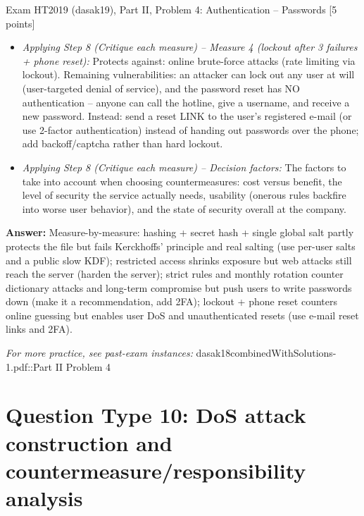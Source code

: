 \documentclass[12pt, a4paper]{article}
\begin{document}
\begin{practicebox}{Exam HT2019 (dasak19), Part II, Problem 4: Authentication -- Passwords [5 points]}
\begin{itemize}
    \item \textit{Applying Step 8 (Critique each measure) -- Measure 4 (lockout after 3 failures + phone reset):} Protects against: online brute-force attacks (rate limiting via lockout). Remaining vulnerabilities: an attacker can lock out any user at will (user-targeted denial of service), and the password reset has NO authentication -- anyone can call the hotline, give a username, and receive a new password. Instead: send a reset LINK to the user's registered e-mail (or use 2-factor authentication) instead of handing out passwords over the phone; add backoff/captcha rather than hard lockout.
    \item \textit{Applying Step 8 (Critique each measure) -- Decision factors:} The factors to take into account when choosing countermeasures: cost versus benefit, the level of security the service actually needs, usability (onerous rules backfire into worse user behavior), and the state of security overall at the company.
\end{itemize}
\textbf{Answer:} Measure-by-measure: hashing + secret hash + single global salt partly protects the file but fails Kerckhoffs' principle and real salting (use per-user salts and a public slow KDF); restricted access shrinks exposure but web attacks still reach the server (harden the server); strict rules and monthly rotation counter dictionary attacks and long-term compromise but push users to write passwords down (make it a recommendation, add 2FA); lockout + phone reset counters online guessing but enables user DoS and unauthenticated resets (use e-mail reset links and 2FA).
\end{practicebox}

\textit{For more practice, see past-exam instances:} dasak18combinedWithSolutions-1.pdf::Part II Problem 4

\section{Question Type 10: DoS attack construction and countermeasure/responsibility analysis}
\end{document}
